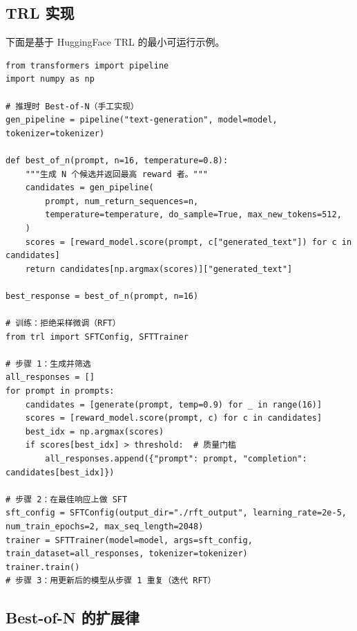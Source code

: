 \subsection{TRL 实现}
\label{trl-implementation-4}

下面是基于 HuggingFace TRL 的最小可运行示例。

\begin{lstlisting}[style=pythonstyle]
from transformers import pipeline
import numpy as np

# 推理时 Best-of-N（手工实现）
gen_pipeline = pipeline("text-generation", model=model, tokenizer=tokenizer)

def best_of_n(prompt, n=16, temperature=0.8):
    """生成 N 个候选并返回最高 reward 者。"""
    candidates = gen_pipeline(
        prompt, num_return_sequences=n,
        temperature=temperature, do_sample=True, max_new_tokens=512,
    )
    scores = [reward_model.score(prompt, c["generated_text"]) for c in candidates]
    return candidates[np.argmax(scores)]["generated_text"]

best_response = best_of_n(prompt, n=16)

# 训练：拒绝采样微调（RFT）
from trl import SFTConfig, SFTTrainer

# 步骤 1：生成并筛选
all_responses = []
for prompt in prompts:
    candidates = [generate(prompt, temp=0.9) for _ in range(16)]
    scores = [reward_model.score(prompt, c) for c in candidates]
    best_idx = np.argmax(scores)
    if scores[best_idx] > threshold:  # 质量门槛
        all_responses.append({"prompt": prompt, "completion": candidates[best_idx]})

# 步骤 2：在最佳响应上做 SFT
sft_config = SFTConfig(output_dir="./rft_output", learning_rate=2e-5, num_train_epochs=2, max_seq_length=2048)
trainer = SFTTrainer(model=model, args=sft_config, train_dataset=all_responses, tokenizer=tokenizer)
trainer.train()
# 步骤 3：用更新后的模型从步骤 1 重复（迭代 RFT）
\end{lstlisting}

\subsection{Best-of-N 的扩展律}
\label{scaling-laws-for-best-of-n}

